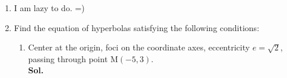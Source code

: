 \documentclass{report}
\newcommand{\sol}{\vspace{1em}\\\textbf{Sol.}}
\newcommand{\eos}{ \qquad \square}
\begin{document}
\begin{enumerate}[leftmargin=*]
\begin{enumerate}
              \item $\dfrac{(x-2)^2}{3}-\dfrac{(y-1)^2}{12}=1$
                    \sol{}
                    \begin{align*}
                        \dfrac{(x-2)^2}{3}-\dfrac{(y-1)^2}{12} & =0                          \\
                        \dfrac{(x-2)^2}{3}                     & =\dfrac{(y-1)^2}{12}        \\
                        12(x-2)^2                              & =3(y-1)^2                   \\
                        4(x-2)^2                               & =(y-1)^2                    \\
                        2(x-2)                                 & =\pm(y-1)                   \\
                        2x-4                                   & =\pm(y-1)                   \\
                        2x-4+y-1 = 0                           & \text{ or } 2x-4-y+1 = 0    \\
                        2x+y-3 = 0                             & \text{ or } 2x-y+5 = 0 \eos
                    \end{align*}
          \end{enumerate}

    \item I am lazy to do. =)

    \item Find the equation of hyperbolas satisfying the following conditions:
          \begin{enumerate}
              \item Center at the origin, foci on the coordinate axes, eccentricity $e=\sqrt{2}$,
                    passing through point $\mathrm{M}(-5,3)$. \sol{}


\end{enumerate}
\end{enumerate}
\end{document}
